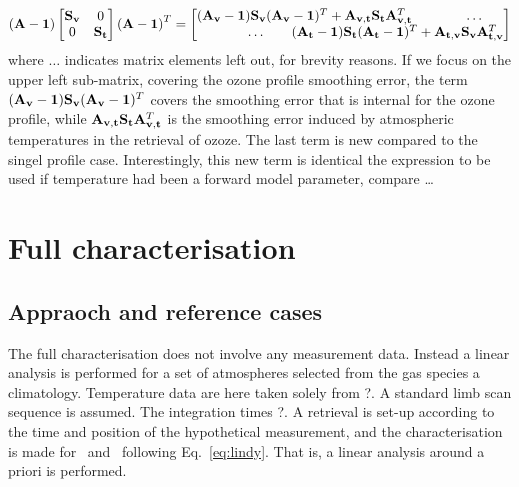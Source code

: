 \begin{displaymath}
  \left(\AvrKrnMtr-\IdnMtr\right)
  \begin{bmatrix}
    \aCvrMtr{\VctStl{v}} & 0 \\
    0 & \aCvrMtr{\VctStl{t}} 
  \end{bmatrix} 
  \left(\AvrKrnMtr-\IdnMtr\right)^T =
  \begin{bmatrix}
    (\AvrKrnMtr_{\VctStl{v}}-\IdnMtr)\aCvrMtr{\VctStl{v}}
    (\AvrKrnMtr_{\VctStl{v}}-\IdnMtr)^T + 
    \AvrKrnMtr_{\VctStl{v},\VctStl{t}}\aCvrMtr{\VctStl{t}}\AvrKrnMtr_{\VctStl{v},\VctStl{t}}^T
    & \hspace{5mm}\dots \\
    \hspace{-25mm}\dots & \hspace{-35mm}%
    (\AvrKrnMtr_{\VctStl{t}}-\IdnMtr)\aCvrMtr{\VctStl{t}}
    (\AvrKrnMtr_{\VctStl{t}}-\IdnMtr)^T + 
    \AvrKrnMtr_{\VctStl{t},\VctStl{v}}\aCvrMtr{\VctStl{v}}\AvrKrnMtr_{\VctStl{t},\VctStl{v}}^T
  \end{bmatrix} 
\end{displaymath}
where $\dots$ indicates matrix elements left out, for brevity reasons. If we
focus on the upper left sub-matrix, covering the ozone profile smoothing error,
the term $(\mathbf{A}_{\mathbf{v}}-\mathbf{1})\mathbf{S}_{\mathbf{v}}
(\mathbf{A}_{\mathbf{v}}-\mathbf{1})^T$ covers the smoothing error that is
internal for the ozone profile, while
$\mathbf{A}_{\mathbf{v},\mathbf{t}}\mathbf{S}_{\mathbf{t}}\mathbf{A}_{\mathbf{v},\mathbf{t}}^T$
is the smoothing error induced by atmospheric temperatures in the retrieval of
ozoze. The last term is new compared to the singel profile case. Interestingly,
this new term is identical the expression to be used if temperature had been a
forward model parameter, compare \dots




\section{Full characterisation}
%


\subsection{Appraoch and reference cases}
\label{sec:fullchar:select}
%
The full characterisation does not involve any measurement data. Instead a
linear analysis is performed for a set of atmospheres selected from the gas
species a climatology. Temperature data are here taken solely from
?. A standard limb scan sequence is assumed. The integration times
?. A retrieval is set-up according to the time and
position of the hypothetical measurement, and the characterisation is made for 
\aWfnMtr{\SttVct}\ and \CtrFncMtr\ following Eq.~\ref{eq:lindy}.
That is, a linear analysis around a priori is performed.
\\


